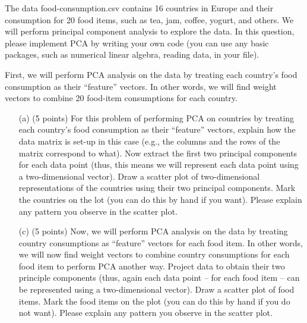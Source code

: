 \documentclass[twoside,10pt]{article}
\begin{document}
The data \textsf{food-consumption.csv} contains 16 countries in Europe and their consumption for 20 food items, such as tea, jam, coffee, yogurt, and others. We will perform principal component analysis to explore the data. In this question, please implement PCA by writing your own code (you can use any basic packages, such as numerical linear algebra, reading data, in your file).


\vspace{.1in}
First, we will perform PCA analysis on the data by treating each country's food consumption as their ``feature'' vectors. In other words, we will find weight vectors to combine 20 food-item consumptions for each country.  
 
\begin{enumerate}

\item[(a)] (5 points) For this problem of performing PCA on countries by treating each country's food consumption as their ``feature'' vectors, explain how the data matrix is set-up in this case (e.g., the columns and the rows of the matrix correspond to what). Now extract the first two principal components for each data point (thus, this means we will represent each data point using a two-dimensional vector). Draw a scatter plot of two-dimensional representations of the countries using their two principal components. Mark the countries on the lot (you can do this by hand if you want). Please explain any pattern you observe in the scatter plot.

\item[(c)] (5 points) Now, we will perform PCA analysis on the data by treating country consumptions as ``feature'' vectors for each food item. In other words, we will now find weight vectors to combine country consumptions for each food item to perform PCA another way. Project data to obtain their two principle components (thus, again each data point -- for each food item -- can be represented using a two-dimensional vector). Draw a scatter plot of food items. Mark the food items on the plot (you can do this by hand if you do not want). Please explain any pattern you observe in the scatter plot.
\end{enumerate}
\end{document}
